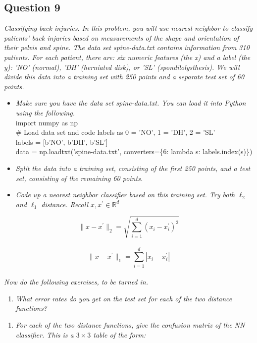 \documentclass{article}
\begin{document}
\parbox{\textwidth}{}

\subsection*{Question 9}

\textit{Classifying back injuries. In this problem, you will use nearest neighbor to classify patients' back
injuries based on measurements of the shape and orientation of their pelvis and spine.
The data set spine-data.txt contains information from 310 patients. For each patient, there are:
six numeric features (the x) and a label (the y): 'NO' (normal), 'DH' (herniated disk), or 'SL'
(spondilolysthesis). We will divide this data into a training set with 250 points and a separate test set
of 60 points.}

\begin{itemize}
    \item \textit{Make sure you have the data set spine-data.txt. You can load it into Python using the following.}\\
    import numpy as np\\
    \# Load data set and code labels as 0 = 'NO', 1 = 'DH', 2 = 'SL'\\
    labels = [b'NO', b'DH', b'SL']\\
    data = np.loadtxt('spine-data.txt', converters=\{6: lambda s: labels.index(s)\})\\
    \item \textit{Split the data into a training set, consisting of the first 250 points, and a test set, consisting of
the remaining 60 points.}
    \item \textit{Code up a nearest neighbor classifier based on this training set. Try both $\ell_2$ and $\ell_1$ distance. Recall $x, x^{\prime} \in \mathbb{R}^d$}
\end{itemize}

$$\|x-x^{\prime}\|_2 = \sqrt{\sum_{i=1}^{d} (x_i - x^{\prime}_i)^2}$$\\

$$\|x-x^{\prime}\|_1 = \sum_{i=1}^{d} |x_i - x^{\prime}_i|$$\\

\textit{Now do the following exercises, to be turned in.}

\begin{enumerate}[label=(a)]
  \item \textit{What error rates do you get on the test set for each of the two distance functions?}
\end{enumerate}
\begin{enumerate}[label=(b)]
  \item \textit{For each of the two distance functions, give the confusion matrix of the NN classifier. This is a
$3 \times 3$ table of the form:}
\end{enumerate}
\end{document}

